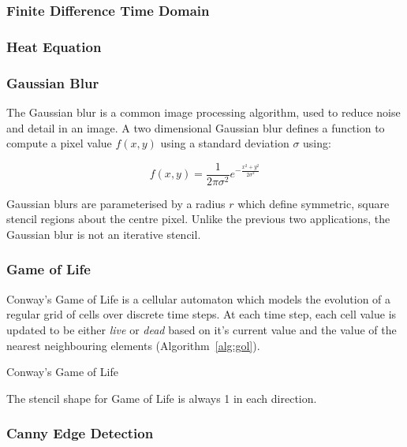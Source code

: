 
\subsubsection{Finite Difference Time Domain}

\subsubsection{Heat Equation}

\subsubsection{Gaussian Blur}

The Gaussian blur is a common image processing algorithm, used to
reduce noise and detail in an image. A two dimensional Gaussian blur
defines a function to compute a pixel value $f(x,y)$ using a standard
deviation $\sigma$ using:

\begin{equation}
f(x,y) = \frac{1}{2\pi\sigma^2}e^{-\frac{x^2 + y^2}{2\sigma^2}}
\end{equation}

Gaussian blurs are parameterised by a radius $r$ which define
symmetric, square stencil regions about the centre
pixel.  Unlike the
previous two applications, the Gaussian blur is not an iterative
stencil.

\subsubsection{Game of Life}

Conway's Game of Life\CitationNeeded{} is a cellular automaton which
models the evolution of a regular grid of cells over discrete time
steps. At each time step, each cell value is updated to be either
\emph{live} or \emph{dead} based on it's current value and the value
of the nearest neighbouring elements (Algorithm~\ref{alg:gol}).

\begin{algorithm}[b]
\caption{Conway's Game of Life}
\label{alg:gol}

\end{algorithm}

The stencil shape for Game of Life is always 1 in each direction.

\subsubsection{Canny Edge Detection}

